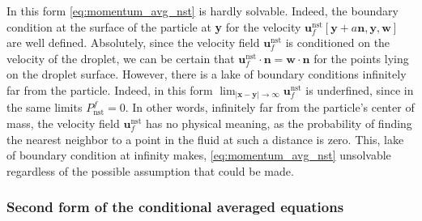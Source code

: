 In this form \ref{eq:momentum_avg_nst} is hardly solvable. 
Indeed, the boundary condition at the surface of the particle at \textbf{y} for the velocity $\textbf{u}_f^\text{nst}[\textbf{y}+a \textbf{n}, \textbf{y},\textbf{w}]$ are well defined.  
Absolutely, since the velocity field $\textbf{u}_f^\text{nst}$ is conditioned on the velocity of the droplet, we can be certain that $\textbf{u}_f^\text{nst}\cdot \textbf{n} = \textbf{w}\cdot \textbf{n}$ for the points lying on the droplet surface. 
However, there is a lake of boundary conditions infinitely far from the particle. 
Indeed, in this form $\lim_{|\textbf{x}- \textbf{y}|\to \infty} \textbf{u}^\text{nst}_f$ is underfined, since in the same limits $P_\text{nst}^f = 0$.
In other words, infinitely far from the particle's center of mass, the velocity field $\textbf{u}^\text{nst}_f$ has no physical meaning, as the probability of finding the nearest neighbor to a point in the fluid at such a distance is zero.
This, lake of boundary condition at infinity makes, \ref{eq:momentum_avg_nst} unsolvable regardless of the possible assumption that could be made.

\subsubsection{Second form of the conditional averaged equations}

